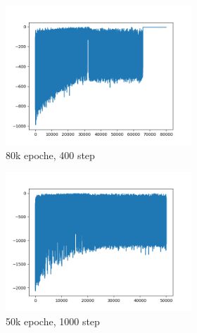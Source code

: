\begin{figure}[H]
\begin{subfigure}{\textwidth}
\begin{subfigure}{.33\textwidth}
			\includegraphics[width=1\linewidth]{img/plot_80k_400.png}
			\caption{80k epoche, 400 step}
		\end{subfigure}%
		\begin{subfigure}{.33\textwidth}
			\centering
			\includegraphics[width=1\linewidth]{img/plot_50k_1000.png}
			\caption{50k epoche, 1000 step}
		\end{subfigure}%
		\begin{subfigure}{.33\textwidth}
			\centering

\end{subfigure}
\end{subfigure}
\end{figure}
